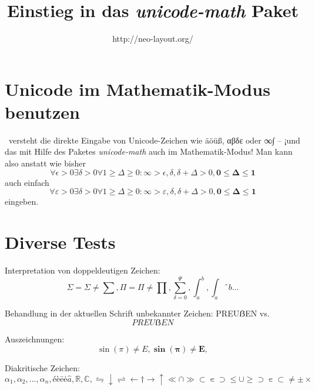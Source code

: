 \documentclass{article}
\begin{document}
\title{Einstieg in das \emph{unicode-math} Paket}
\author{http://neo-layout.org/}
\maketitle

\section{Unicode im Mathematik-Modus benutzen}
\XeLaTeX\ versteht die direkte Eingabe von Unicode-Zeichen wie äöüß, αβδε oder ∞∫ – ¡und das mit Hilfe des Paketes \emph{unicode-math} auch im Mathematik-Modus! Man kann also anstatt wie bisher
\[ \forall \epsilon>0 \exists \delta>0 \forall 1 \geq\Delta\geq0: \infty>\epsilon,\delta,\delta+\Delta>0, \mathbf{0\leq\Delta\leq1} \]
auch einfach
\[ ∀ ε>0 ∃ δ>0 ∀1≥Δ≥0: ∞>ε,δ,δ+Δ>0, \mathbf{0≤Δ≤1} \]
eingeben.

\section{Diverse Tests}
Interpretation von doppeldeutigen Zeichen:
\[ Σ=\Sigma ≠ \sum, Π=\Pi ≠ \prod, \sum_{δ=0}^Ψ, ∫_a^b, \int_aˆb… \]

Behandlung in der aktuellen Schrift unbekannter Zeichen: PREUẞEN vs.
\[ PREUẞEN \]

Auszeichnungen:
\[ \sin(π) ≠ E, \mathbf{\sin(π) ≠ E,}  \]

Diakritische Zeichen:
\[ α_1, α_2, …, α_n, é è ē ė \hat{a}, ℝ, ℂ, ⇋↓⇌←†→↑≪∩≫⊂∊⊃≤∪≥⊃∊⊂≠±× \]
\end{document}
